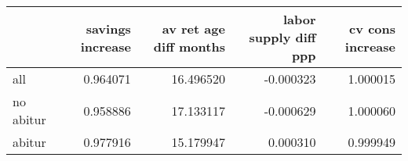 \begin{tabular}{lrrrr}
\toprule
 & savings increase & av ret age diff months & labor supply diff ppp & cv cons increase \\
\midrule
all & 0.964071 & 16.496520 & -0.000323 & 1.000015 \\
no abitur & 0.958886 & 17.133117 & -0.000629 & 1.000060 \\
abitur & 0.977916 & 15.179947 & 0.000310 & 0.999949 \\
\bottomrule
\end{tabular}
